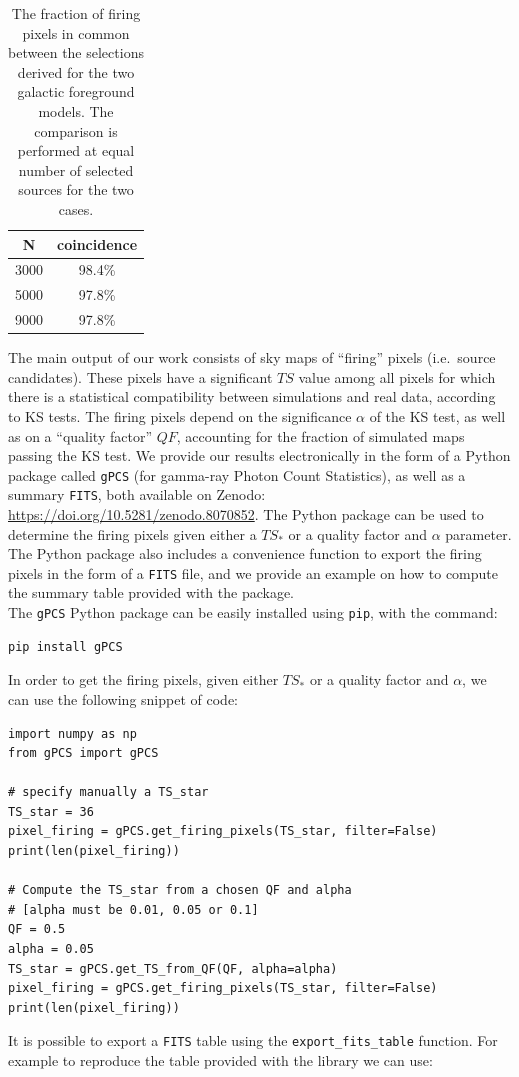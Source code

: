 \documentclass{article}
\begin{document}
\begin{table}[t]
    \renewcommand{\arraystretch}{1.2}
    \centering
    \begin{tabular}{|c|c|}  
    \hline
        N &  coincidence  \\
        \hline 
       3000 & 98.4\% \\
        \hline 
       5000 & 97.8\% \\
        \hline 
       9000 & 97.8\% \\
       \hline
    \end{tabular}
\caption{The fraction of firing pixels in common between the selections derived for the two galactic foreground models. The comparison is performed at equal number of selected sources for the two cases.}  
\label{tab:bck_comp}
\end{table}


The main output of our work consists of sky maps of ``firing'' pixels (i.e.~source candidates). These pixels have a significant $TS$ value among all pixels for which there is a statistical compatibility between simulations and real data, according to KS tests. The firing pixels depend on the significance $\alpha$ of the KS test, as well as on a ``quality factor'' $QF$, accounting for the fraction of simulated maps passing the KS test.
We provide our results electronically in the form of a Python package called \verb|gPCS|  (for gamma-ray Photon Count Statistics), as well as a summary \verb|FITS|, both available on Zenodo: \href{https://doi.org/10.5281/zenodo.8070852}{https://doi.org/10.5281/zenodo.8070852}. The Python package can be used to determine the firing pixels given either a $TS_*$ or a quality factor and $\alpha$ parameter. The Python package also includes a convenience function to export the firing pixels in the form of a \verb|FITS| file, and we provide an example on how to compute the summary table provided with the package.
\\
The \verb|gPCS| Python package can be easily installed using \verb|pip|, with the command:
\begin{lstlisting}[language=iPython]
pip install gPCS
\end{lstlisting}
In order to get the firing pixels, given either $TS_*$ or a quality factor and $\alpha$, we can use the following snippet of code:

\begin{lstlisting}[language=iPython]
import numpy as np
from gPCS import gPCS

# specify manually a TS_star
TS_star = 36
pixel_firing = gPCS.get_firing_pixels(TS_star, filter=False)
print(len(pixel_firing))

# Compute the TS_star from a chosen QF and alpha
# [alpha must be 0.01, 0.05 or 0.1]
QF = 0.5
alpha = 0.05
TS_star = gPCS.get_TS_from_QF(QF, alpha=alpha)
pixel_firing = gPCS.get_firing_pixels(TS_star, filter=False)
print(len(pixel_firing))
\end{lstlisting}
It is possible to export a \verb|FITS| table using the \verb|export_fits_table| function. For example to reproduce the table provided with the library we can use:
\end{document}
